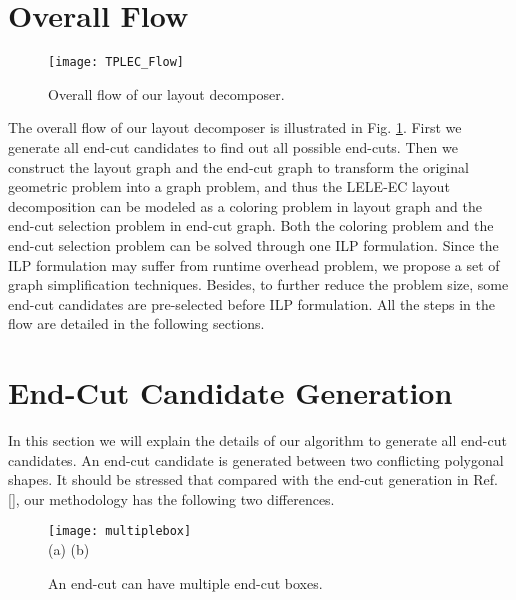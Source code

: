 \documentclass[12pt]{spieman}
\theoremstyle{plain}
\begin{document}
\begin{spacing}{1}
\section{Overall Flow}
\label{sec:tplec_overview}


\begin{figure}[htb]
  \centering
  \texttt{[image: TPLEC\_Flow]}
  \caption{Overall flow of our layout decomposer.}
  \label{fig:tplec_flow}
\end{figure}

The overall flow of our layout decomposer is illustrated in Fig. \ref{fig:tplec_flow}.
First we generate all end-cut candidates to find out all possible end-cuts.
Then we construct the layout graph and the end-cut graph to transform the original geometric problem into a graph problem,
and thus the LELE-EC layout decomposition can be modeled as a coloring problem in layout graph and the end-cut selection problem in end-cut graph.
Both the coloring problem and the end-cut selection problem can be solved through one ILP formulation.
Since the ILP formulation may suffer from runtime overhead problem, we propose a set of graph simplification techniques.
Besides, to further reduce the problem size, some end-cut candidates are pre-selected before ILP formulation.
All the steps in the flow are detailed in the following sections.


\section{End-Cut Candidate Generation}
\label{sec:tplec_endcut}


In this section we will explain the details of our algorithm to generate all end-cut candidates.
An end-cut candidate is generated between two conflicting polygonal shapes.
It should be stressed that compared with the end-cut generation in Ref. [], our methodology has the following two differences.

\begin{figure}[htb]
  \centering
  \texttt{[image: multiplebox]}
  \\ (a) \hspace{4.4cm} (b)
  \caption{An end-cut can have multiple end-cut boxes.}
  \label{fig:multiplebox}
\end{figure}


\end{spacing}
\end{document}
